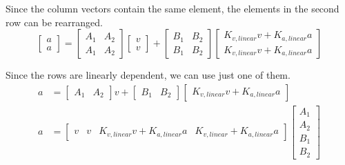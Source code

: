 Since the column vectors contain the same element, the elements in the second
row can be rearranged.
\begin{equation*}
  \begin{bmatrix}
    a \\
    a
  \end{bmatrix} =
  \begin{bmatrix}
    A_1 & A_2 \\
    A_1 & A_2
  \end{bmatrix}
  \begin{bmatrix}
    v \\
    v
  \end{bmatrix} +
  \begin{bmatrix}
    B_1 & B_2 \\
    B_1 & B_2
  \end{bmatrix}
  \begin{bmatrix}
    K_{v,linear} v + K_{a,linear} a \\
    K_{v,linear} v + K_{a,linear} a
  \end{bmatrix}
\end{equation*}

Since the rows are linearly dependent, we can use just one of them.
\begin{align*}
  a &=
    \begin{bmatrix}
      A_1 & A_2
    \end{bmatrix} v +
    \begin{bmatrix}
      B_1 & B_2
    \end{bmatrix}
    \begin{bmatrix}
      K_{v,linear} v + K_{a,linear} a
    \end{bmatrix} \\
  a &=
    \begin{bmatrix}
      v & v & K_{v,linear} v + K_{a,linear} a & K_{v,linear} + K_{a,linear} a
    \end{bmatrix}
    \begin{bmatrix}
      A_1 \\
      A_2 \\
      B_1 \\
      B_2
    \end{bmatrix}
\end{align*}

